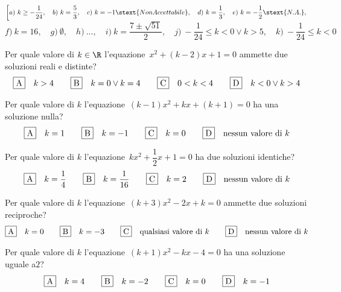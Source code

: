 \begin{flushright}
{\small
\(\left[
a)~ k \geq-\dfrac{1}{24} ,\quad 
b)~ k = \dfrac{5}{3} ,\quad 
c)~ k=-1 \stext{Non Accettabile},\quad 
d)~ k = \dfrac{1}{3} ,\quad 
e)~ k =-\dfrac{1}{2} \stext{N.A.},\right.\)\\
\(\left. 
f)~ k = 16,\quad 
g)~ \emptyset,\quad 
h)~ ...,\quad 
i)~ k = \dfrac{7 \pm \sqrt{51}}{2} ,\quad 
j)~ - \dfrac{1}{24} \leq k < 0 \vee k > 5 ,\quad 
k)~ - \dfrac{1}{24} \leq k < 0 \right.\)
}
\end{flushright}

\begin{esercizio}
\label{ese:3.106}
Per quale valore di \(k \in \R\) l'equazione~\(x^{2} + (k-2) x + 1 = 0\) 
ammette 
due soluzioni reali e distinte?
\[\fbox{A}\quad k > 4\qquad\fbox{B}\quad k = 0 \vee k = 
4\qquad\fbox{C}\quad 0 < k < 4\qquad\fbox{D}\quad k < 0 \vee k > 4\]
\end{esercizio}

\begin{esercizio}
\label{ese:3.107}
Per quale valore di \(k\) l'equazione~\((k-1) x^{2} + kx + (k + 1) = 0\) ha 
una soluzione nulla?
\[\fbox{A}\quad k = 1\qquad\fbox{B}\quad k = -1\qquad\fbox{C}\quad k 
=0\qquad\fbox{D}\quad \text{nessun valore di }k\]
\end{esercizio}

\begin{esercizio}
\label{ese:3.108}
Per quale valore di \(k\) l'equazione~\(kx^{2} + \dfrac{1}{2} x + 1 = 0\) ha 
due 
soluzioni identiche?
\[\fbox{A}\quad k = \dfrac{1}{4}\qquad\fbox{B}\quad k = 
\dfrac{1}{16}\qquad\fbox{C}\quad k 
= 2\qquad\fbox{D}\quad \text{nessun valore di }k\]
\end{esercizio}

\begin{esercizio}
\label{ese:3.109}
Per quale valore di \(k\) l'equazione~\((k + 3) x^{2}-2x + k = 0\) ammette 
due 
soluzioni reciproche?
\[\fbox{A}\quad k = 0\qquad\fbox{B}\quad k = -3\qquad\fbox{C}\quad 
\text{qualsiasi 
valore 
di }k\qquad\fbox{D}\quad \text{nessun valore di }k\]
\end{esercizio}

\begin{esercizio}
\label{ese:3.110}
Per quale valore di \(k\) l'equazione~\((k + 1) x^{2}-kx-4 = 0\) ha una 
soluzione 
uguale a\(2\)?
\[\fbox{A}\quad k = 4\qquad\fbox{B}\quad k =-2\qquad\fbox{C}\quad k = 
0\qquad\fbox{D}\quad k 
=-1\]
\end{esercizio}

